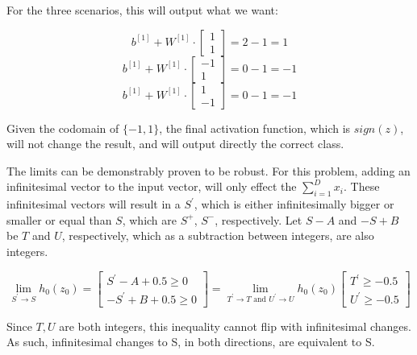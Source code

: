 \documentclass[12pt]{article}
\begin{document}
\begin{itemize}
        For the three scenarios, this will output what we want:

        \[
            b^{[1]}+W^{[1]}\cdot
            \begin{bmatrix}
                1 \\
                1
            \end{bmatrix}
            =
            2 - 1 = 1
        \]
        \[
            b^{[1]}+W^{[1]}\cdot
            \begin{bmatrix}
                -1 \\
                1
            \end{bmatrix}
            =
            0 - 1 = -1
        \]
        \[
            b^{[1]}+W^{[1]}\cdot
            \begin{bmatrix}
                1 \\
                -1
            \end{bmatrix}
            =
            0 - 1 = -1
        \]

        Given the codomain of $\{-1,1\}$, the final activation function, which is $sign(z)$, will not change the result, and will output directly the correct class.

        The limits can be demonstrably proven to be robust. For this problem, adding an infinitesimal vector to the input vector, will only effect the $\sum_{i=1}^{D} x_i$. These infinitesimal vectors will result in a $S^{'}$, which is either infinitesimally bigger or smaller or equal than $S$, which are $S^{+}$, $S^{-}$, respectively. Let $S-A$ and $-S+B$ be $T$ and $U$, respectively, which as a subtraction between integers, are also integers.

        \[
            \lim_{S^{'}\to S}  h_0(z_0) = 
            \begin{bmatrix}
                S^{'} - A + 0.5 \geq 0  \\
            -S^{'} + B + 0.5 \geq 0
            \end{bmatrix}
            = \lim_{T^{'}\to T \text{ and } U^{'}\to U}  h_0(z_0)
            \begin{bmatrix}
                T^{'} \geq - 0.5 \\
                U^{'} \geq - 0.5
            \end{bmatrix}
        \]

        Since $T,U$ are both integers, this inequality cannot flip with infinitesimal changes. As such, infinitesimal changes to S, in both directions, are equivalent to S.


\end{itemize}
\end{document}

